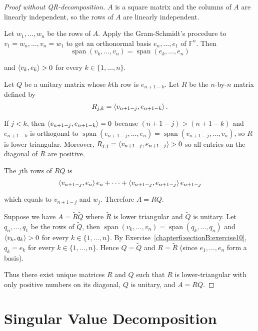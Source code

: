 \begin{proof}[Proof without QR-decomposition]
    $A$ is a square matrix and the columns of $A$ are linearly independent, so the rows of $A$ are linearly independent.

    Let $w_{1}, \ldots, w_{n}$ be the rows of $A$. Apply the Gram-Schmidt's procedure to $v_{1} = w_{n}, \ldots, v_{n} = w_{1}$ to get an orthonormal basis $e_{n}, \ldots, e_{1}$ of $\mathbb{F}^{n}$. Then
    \[
        \operatorname{span}(v_{k}, \ldots, v_{n}) = \operatorname{span}(e_{k}, \ldots, e_{n})
    \]

    and $\left\langle{v_{k}, e_{k}}\right\rangle > 0$ for every $k\in\{1,\ldots,n\}$.

    Let $Q$ be a unitary matrix whose $k$th row is $e_{n+1-k}$. Let $R$ be the $n$-by-$n$ matrix defined by
    \[
        R_{j,k} = \left\langle{v_{n+1-j}, e_{n+1-k}}\right\rangle.
    \]

    If $j < k$, then $\left\langle{v_{n+1-j}, e_{n+1-k}}\right\rangle = 0$ because $(n+1-j) > (n+1-k)$ and $e_{n+1-k}$ is orthogonal to $\operatorname{span}(e_{n+1-j}, \ldots, e_{n}) = \operatorname{span}(v_{n+1-j}, \ldots, v_{n})$, so $R$ is lower triangular. Moreover, $R_{j,j} = \left\langle{v_{n+1-j}, e_{n+1-j}}\right\rangle > 0$ so all entries on the diagonal of $R$ are positive.

    The $j$th rows of $RQ$ is
    \[
        \left\langle{v_{n+1-j}, e_{n}}\right\rangle e_{n} + \cdots + \left\langle{v_{n+1-j}, e_{n+1-j}}\right\rangle e_{n+1-j}
    \]

    which equals to $v_{n+1-j}$ and $w_{j}$. Therefore $A = RQ$.

    Suppose we have $A = \widetilde{R}\widetilde{Q}$ where $\widetilde{R}$ is lower triangular and $\widetilde{Q}$ is unitary. Let $q_{n}, \ldots, q_{1}$ be the rows of $\widetilde{Q}$, then $\operatorname{span}(v_{k}, \ldots, v_{n}) =  \operatorname{span}(q_{k}, \ldots, q_{n})$ and $\left\langle{v_{k}, q_{k}}\right\rangle > 0$ for every $k\in\{1,\ldots, n\}$. By Exercise~\ref{chapter6:sectionB:exercise10}, $q_{k} = e_{k}$ for every $k\in\{1,\ldots,n\}$. Hence $Q = \widetilde{Q}$ and $R = \widetilde{R}$ (since $e_{1},  \ldots, e_{n}$ form a basis).

    Thus there exist unique matrices $R$ and $Q$ such that $R$ is lower-triangular with only positive numbers on its diagonal, $Q$ is unitary, and $A = RQ$.
\end{proof}
\newpage

\section{Singular Value Decomposition}

